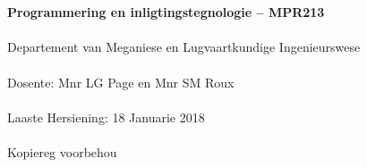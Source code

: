 \begin{titlepage}
    \thispagestyle{empty}
    \\~\\[18cm]
    \large
    \textbf{Programmering en inligtingstegnologie -- MPR213} \\~\\
    Departement van Meganiese en Lugvaartkundige Ingenieurswese \\~\\[0.5cm]
    \normalsize
    Dosente: Mnr LG Page en  Mnr SM Roux \\~\\
    Laaste Hersiening: 18 Januarie 2018 \\~\\[0.5em]
    \textcopyright \quad Kopiereg voorbehou \\~\\
\end{titlepage}
\restoregeometry
